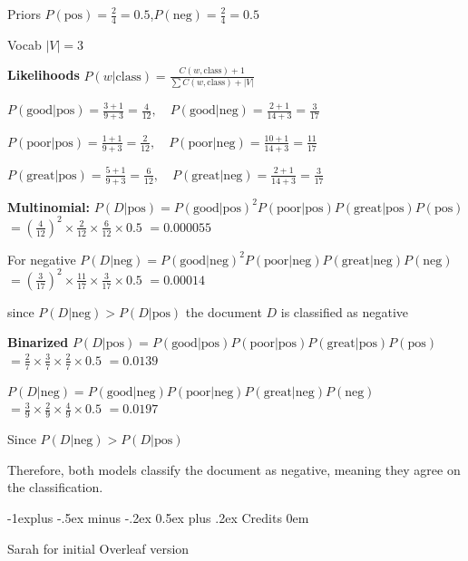 \documentclass[letterpaper, 8pt]{extarticle}
\makeatletter
\renewcommand{\section}{\@startsection{section}{1}{0mm}%
  {-1explus -.5ex minus -.2ex}%
  {0.5ex plus .2ex}%
{\normalfont\small\bfseries}}
\let\olditemize=\itemize \let\endolditemize=\enditemize
\renewenvironment{itemize}{\olditemize \itemsep0em}{\endolditemize}
\makeatother
\begin{document}
\begin{multicols*}{4}
{  }

  Priors
  $P(\text{pos}) = \frac{2}{4} = 0.5$,$P(\text{neg}) = \frac{2}{4} = 0.5$

  Vocab $|V| = 3$

  \textbf{Likelihoods}
  $P(w | \text{class}) = \frac{C(w, \text{class}) + 1}{\sum C(w,
  \text{class}) + |V|}$

  $P(\text{good} | \text{pos}) = \frac{3+1}{9+3} = \frac{4}{12},
  \quad P(\text{good} | \text{neg}) = \frac{2+1}{14+3} = \frac{3}{17}$

  $P(\text{poor} | \text{pos}) = \frac{1+1}{9+3} = \frac{2}{12},
  \quad P(\text{poor} | \text{neg}) = \frac{10+1}{14+3} = \frac{11}{17}$

  $P(\text{great} | \text{pos}) = \frac{5+1}{9+3} = \frac{6}{12},
  \quad P(\text{great} | \text{neg}) = \frac{2+1}{14+3} = \frac{3}{17}$

  \textbf{Multinomial:}
  $P(D | \text{pos}) = P(\text{good} | \text{pos})^2 P(\text{poor} |
  \text{pos}) P(\text{great} | \text{pos}) P(\text{pos})$
  $= \left(\frac{4}{12}\right)^2 \times \frac{2}{12} \times
  \frac{6}{12} \times 0.5$
  $= 0.000055$

  For negative
  $P(D | \text{neg}) = P(\text{good} | \text{neg})^2 P(\text{poor} |
  \text{neg}) P(\text{great} | \text{neg}) P(\text{neg})$
  $= \left(\frac{3}{17}\right)^2 \times \frac{11}{17} \times
  \frac{3}{17} \times 0.5$
  $= 0.00014$

  since
  $
  P(D | \text{neg}) > P(D | \text{pos})
  $
  the document \(D\) is classified as negative

  \textbf{Binarized}
  $P(D | \text{pos}) = P(\text{good} | \text{pos}) P(\text{poor} |
  \text{pos}) P(\text{great} | \text{pos}) P(\text{pos})$
  $= \frac{2}{7} \times \frac{3}{7} \times \frac{2}{7} \times 0.5$
  $= 0.0139$

  $P(D | \text{neg}) = P(\text{good} | \text{neg}) P(\text{poor} |
  \text{neg}) P(\text{great} | \text{neg}) P(\text{neg})$
  $= \frac{3}{9} \times \frac{2}{9} \times \frac{4}{9} \times 0.5$
  $= 0.0197$

  Since
  $P(D | \text{neg}) > P(D | \text{pos})$

  Therefore,  both models classify the document as negative, meaning
  they agree on the classification.

  \section{Credits}
  \begin{itemize}
    \item Sarah for initial Overleaf version
  \end{itemize}
\end{multicols*}
\end{document}
